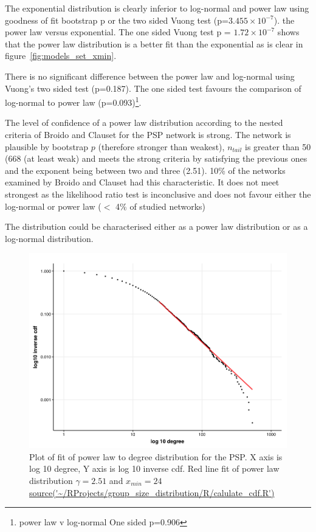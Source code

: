 The exponential distribution is clearly inferior to log-normal and power law using goodness of fit bootstrap p or the two sided Vuong test (p=$3.455\times10^{-7}$). the power law versus exponential. The one sided Vuong test p = $1.72\times10^{-7}$ shows that the power law distribution is a better fit than the exponential as is clear in figure~\ref{fig:models_set_xmin}. 

There is no significant difference between the power law and log-normal using Vuong's two sided test (p=0.187). The one sided test favours the comparison of log-normal to power law (p=0.093)\footnote{power law v log-normal One sided p=0.906}.  

The level of confidence of a power law distribution according to the nested criteria of Broido and Clauset\cite{broido2019scale} for the PSP network is strong. The network is plausible by bootstrap $p$ (therefore stronger than weakest), $n_{tail}$ is greater than 50 (668 (at least weak) and meets the strong criteria by satisfying the previous ones and the exponent being between two and three (2.51). 10\% of the networks examined by Broido and Clauset had this characteristic. It does not meet strongest as the likelihood ratio test is inconclusive and does not favour either the log-normal or power law ($<$ 4\% of studied networks)




The distribution could be characterised either as a power law distribution or as a log-normal distribution.






\begin{figure}
    \centering
    \includegraphics[width=\linewidth]{images/chapter3/ggplot2/theme/powerlaw/Rplot01_chapter3_cdf_and_powerlaw.png}
    \caption[Plot of power law fit to degree distribution of PSP]{Plot of fit of power law to degree distribution for the PSP. X axis is log 10 degree, Y axis is log 10 inverse cdf. Red line fit of power law distribution $\gamma= 2.51$ and $x_{min}=24$ \url{source('~/RProjects/group_size_distribution/R/calulate_cdf.R')}}
    \label{fig:poweRlaw plot ggplot2}
\end{figure}



